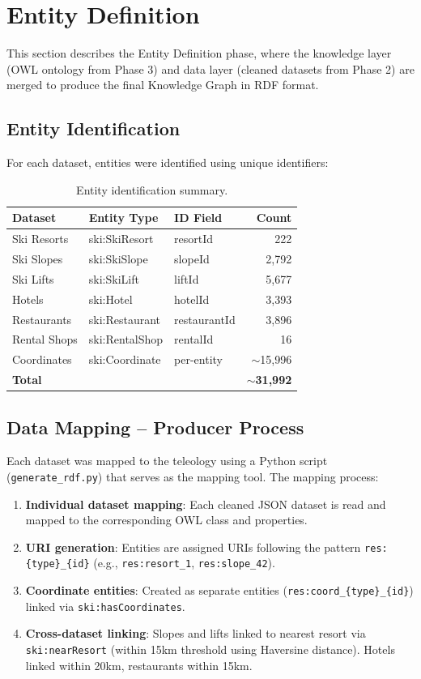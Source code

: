 \section{Entity Definition}

This section describes the Entity Definition phase, where the knowledge layer (OWL ontology from Phase 3) and data layer (cleaned datasets from Phase 2) are merged to produce the final Knowledge Graph in RDF format.

\subsection{Entity Identification}

For each dataset, entities were identified using unique identifiers:

\begin{table}[h!]
\centering
\begin{tabular}{|l|l|l|r|}
\hline
\textbf{Dataset} & \textbf{Entity Type} & \textbf{ID Field} & \textbf{Count} \\
\hline
Ski Resorts & ski:SkiResort & resortId & 222 \\
Ski Slopes & ski:SkiSlope & slopeId & 2,792 \\
Ski Lifts & ski:SkiLift & liftId & 5,677 \\
Hotels & ski:Hotel & hotelId & 3,393 \\
Restaurants & ski:Restaurant & restaurantId & 3,896 \\
Rental Shops & ski:RentalShop & rentalId & 16 \\
Coordinates & ski:Coordinate & per-entity & $\sim$15,996 \\
\hline
\textbf{Total} & & & \textbf{$\sim$31,992} \\
\hline
\end{tabular}
\caption{Entity identification summary.}
\end{table}

\subsection{Data Mapping -- Producer Process}

Each dataset was mapped to the teleology using a Python script (\texttt{generate\_rdf.py}) that serves as the mapping tool. The mapping process:
\begin{enumerate}
    \item \textbf{Individual dataset mapping}: Each cleaned JSON dataset is read and mapped to the corresponding OWL class and properties.
    \item \textbf{URI generation}: Entities are assigned URIs following the pattern \texttt{res:\{type\}\_\{id\}} (e.g., \texttt{res:resort\_1}, \texttt{res:slope\_42}).
    \item \textbf{Coordinate entities}: Created as separate entities (\texttt{res:coord\_\{type\}\_\{id\}}) linked via \texttt{ski:hasCoordinates}.
    \item \textbf{Cross-dataset linking}: Slopes and lifts linked to nearest resort via \texttt{ski:nearResort} (within 15km threshold using Haversine distance). Hotels linked within 20km, restaurants within 15km.
\end{enumerate}

